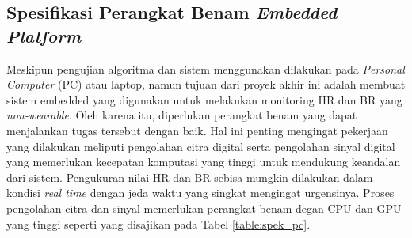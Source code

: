 \subsection{ Spesifikasi Perangkat Benam \textit{Embedded Platform}}
Meskipun pengujian algoritma dan sistem menggunakan dilakukan pada \textit{Personal Computer} (PC) atau laptop, namun tujuan dari proyek akhir ini adalah membuat sistem embedded yang digunakan untuk melakukan monitoring HR dan BR yang \textit{non-wearable}. Oleh karena itu, diperlukan perangkat benam yang dapat menjalankan tugas tersebut dengan baik. Hal ini penting mengingat pekerjaan yang dilakukan meliputi pengolahan citra digital serta pengolahan sinyal digital yang memerlukan kecepatan komputasi yang tinggi untuk mendukung keandalan dari sistem. Pengukuran nilai HR dan BR sebisa mungkin dilakukan dalam kondisi \textit{real time} dengan jeda waktu yang singkat mengingat urgensinya. Proses pengolahan citra dan sinyal memerlukan perangkat benam degan CPU dan GPU yang tinggi seperti yang disajikan pada Tabel \ref{table:spek_pc}.

\begin{table}[ht]
\vspace{0.8em}
\caption{Spesifikasi Perangkat Benam untuk Prosas Monitoring HR dan BR}
\centering
\label{table:spek_pc}
\end{table}


